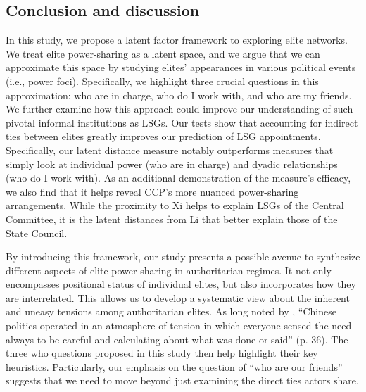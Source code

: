 \documentclass[11pt,english]{article}
\begin{document}
\begin{flushleft}
\section*{Conclusion and discussion}

In this study, we propose a latent factor framework to exploring elite networks. We treat elite power-sharing as a latent space, and we argue that we can approximate this space by studying elites' appearances in various political events (i.e., power foci). Specifically, we highlight three crucial questions in this approximation: who are in charge, who do I work with, and who are my friends. We further examine how this approach could improve our understanding of such pivotal informal institutions as LSGs. Our tests show that accounting for indirect ties between elites greatly improves our prediction of LSG appointments. Specifically, our latent distance measure notably outperforms measures that simply look at individual power (who are in charge) and dyadic relationships (who do I work with). As an additional demonstration of the measure's efficacy, we also find that it helps reveal CCP's more nuanced power-sharing arrangements. While the proximity to Xi helps to explain LSGs of the Central Committee, it is the latent distances from Li that better explain those of the State Council.

By introducing this framework, our study presents a possible avenue to synthesize different aspects of elite power-sharing in authoritarian regimes. It not only encompasses positional status of individual elites, but also incorporates how they are interrelated. This allows us to develop a systematic view about the inherent and uneasy tensions among authoritarian elites. As long noted by \citet{Pye1995}, ``Chinese politics operated in an atmosphere of tension in which everyone sensed the need always to be careful and calculating about what was done or said'' (p. 36). The three who questions proposed in this study then help highlight their key heuristics. Particularly, our emphasis on the question of ``who are our friends'' suggests that we need to move beyond just examining the direct ties actors share.


\end{flushleft}
\end{document}
